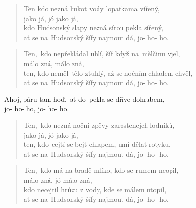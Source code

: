 \begin{song}{}
\begin{verse}
   Ten kdo nezná hukot vody lopatkama vířený, \\
   jako já, jó jako já, \\
   kdo Hudsonský slapy nezná sírou pekla sířený, \\
   ať se na~Hudsonský šífy najmout dá, jo- ho- ho.
\end{verse}
\begin{verse}
   Ten,~kdo nepřekládal uhlí, šíf když na~mělčinu vjel, \\
   málo zná, málo zná, \\
   ten, kdo neměl~tělo ztuhlý, až se nočním chladem chvěl, \\
   ať se na~Hudsonský šífy najmout dá, jo- ho- ho.
\end{verse}
\begin{refren}
   Ahoj, páru tam hoď,~ať do~pekla se dříve dohrabem, \\
   jo- ho- ho, jo- ho- ho.
\end{refren}
\begin{verse}
   Ten,~kdo nezná noční zpěvy zarostenejch lodníků,  \\
   jako já, jó jako já, \\
   ten, kdo~cejtí se bejt chlapem, umí dělat rotyku, \\
   ať se na~Hudsonský šífy najmout dá, jo- ho- ho.
\end{verse}
\begin{verse}
   Ten,~kdo má na bradě mlíko, kdo se rumem neopil, \\
   málo zná, jó málo zná, \\
   kdo necejtil hrůzu z vody, kde se málem utopil, \\
   ať se na~Hudsonský šífy najmout dá, jo- ho- ho.

\end{verse}
\end{song}
